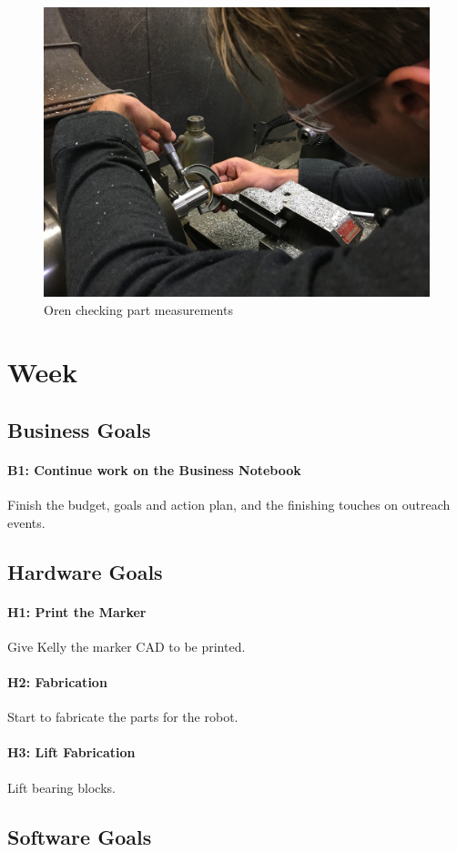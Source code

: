 \documentclass{article}
\begin{document}
\begin{figure}
    \centering
    \includegraphics[width=.6 \textwidth]{08_10-22/images/IMG_0330.JPG}
    \caption{Oren checking part measurements}
    \label{fig: Turning Inserts}
\end{figure}

\clearpage \newpage \section{Week \thesection} 
\subsection{Business Goals}
\paragraph{B1: Continue work on the Business Notebook}
 Finish the budget, goals and action plan, and the finishing touches on outreach events.
\subsection{Hardware Goals}
\paragraph{H1: Print the Marker}
 Give Kelly the marker CAD to be printed.
\paragraph{H2: Fabrication}
 Start to fabricate the parts for the robot.
\paragraph{H3: Lift Fabrication}
 Lift bearing blocks.
\subsection{Software Goals}
\end{document}
